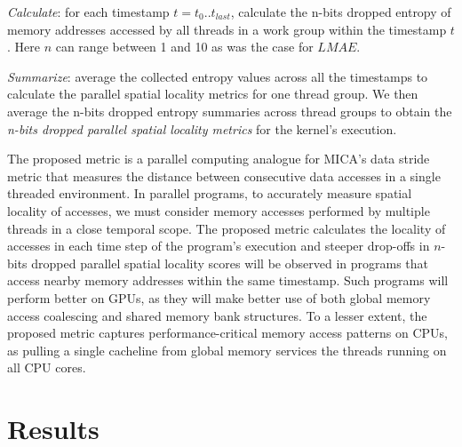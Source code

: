 \documentclass[review=false, sigchi]{acmart}
\begin{document}
	\textit{Calculate}: for each timestamp $t = t_0 .. t_{last}$, calculate the n-bits dropped entropy of memory addresses accessed by all threads in a work group within the timestamp $t$. Here $n$ can range between 1 and 10 as was the case for $LMAE$.
	
	\textit{Summarize}: average the collected entropy values across all the timestamps to calculate the parallel spatial locality metrics for one thread group. We then average the n-bits dropped entropy summaries across thread groups to obtain the \textit{n-bits dropped parallel spatial locality metrics} for the kernel's execution.
	
	

	The proposed metric is a parallel computing analogue for MICA's data stride metric that measures the distance between consecutive data accesses in a single threaded environment. 
	In parallel programs, to accurately measure spatial locality of accesses, we must consider memory accesses performed by multiple threads in a close temporal scope. 
	The proposed metric calculates the locality of accesses in each time step of the program's execution and steeper drop-offs in $n$-bits dropped parallel spatial locality scores will be observed in programs that access nearby memory addresses within the same timestamp.
	Such programs will perform better on GPUs, as they will make better use of both global memory access coalescing and shared memory bank structures.
	To a lesser extent, the proposed metric captures performance-critical memory access patterns on CPUs, as pulling a single cacheline from global memory services the threads running on all CPU cores. %
	
	\section{Results} \label{results}
	
\end{document}
